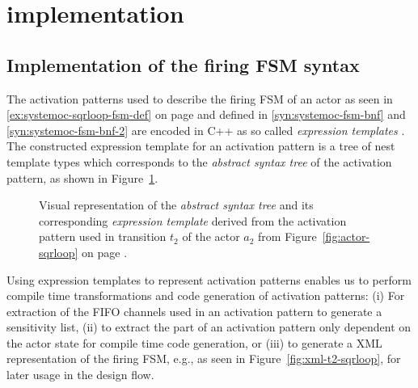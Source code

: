 \section{\SysteMoC{} implementation}\label{sec:systemoc-implementation}

\subsection{Implementation of the firing FSM syntax}

The activation patterns used to describe the firing FSM of an actor as seen in \ref{ex:systemoc-sqrloop-fsm-def} on page \pageref{ex:systemoc-sqrloop-fsm-def} and defined in \ref{syn:systemoc-fsm-bnf} and \ref{syn:systemoc-fsm-bnf-2} are encoded in C++ as so called \emph{expression templates} \cite{veldhuizen:1995}.
The constructed expression template for an activation pattern is a tree of nest template types which corresponds to the \emph{abstract syntax tree} of the activation pattern, as shown in Figure~\ref{fig:ast-t2-sqrloop}.

\begin{figure}[h]
\centering
\resizebox{\textwidth}{!}{}
%
\caption{\label{fig:ast-t2-sqrloop}%
Visual representation of the \emph{abstract syntax tree} and its corresponding \emph{expression template} derived from the activation pattern used in transition $t_2$ of the  actor $a_2$ from Figure~\ref{fig:actor-sqrloop} on page \pageref{fig:actor-sqrloop}.
}
\end{figure}

Using expression templates to represent activation patterns enables us to perform compile time transformations and code generation of activation patterns:
(i) For extraction of the FIFO channels used in an activation pattern to generate a sensitivity list,
(ii) to extract the part of an activation pattern only dependent on the actor state for compile time code generation, or
(iii) to generate a XML representation of the firing FSM, e.g., as seen in Figure~\ref{fig:xml-t2-sqrloop}, for later usage in the design flow.

